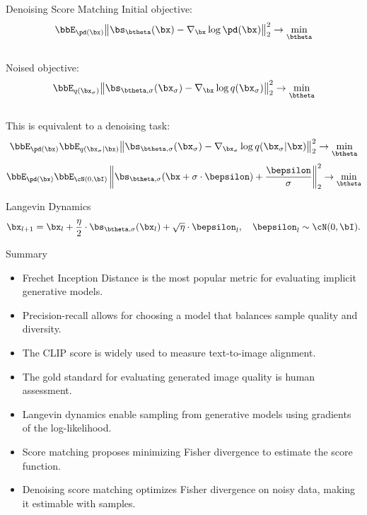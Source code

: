\documentclass{beamer}
\begin{document}
\begin{frame}{Denoising Score Matching}
	Initial objective:
	\vspace{-0.2cm}
	\[
		\bbE_{\pd(\bx)}\big\| \bs_{\btheta}(\bx) - \nabla_\bx \log \pd(\bx) \big\|^2_2 \rightarrow \min_{\btheta}
	\]
	\eqpause
	\vspace{-0.5cm} \\
	Noised objective:
	\vspace{-0.2cm}
	\[
		\bbE_{q(\bx_{\sigma})}\big\| \bs_{\btheta, \sigma}(\bx_\sigma) - \nabla_\bx \log q(\bx_{\sigma}) \big\|^2_2 \rightarrow \min_{\btheta}
	\]
	\eqpause
	\vspace{-0.5cm} \\
	This is equivalent to a denoising task:
	\vspace{-0.2cm}
	\[
		\bbE_{\pd(\bx)} \bbE_{q(\bx_{\sigma} | \bx)}\big\| \bs_{\btheta, \sigma}(\bx_{\sigma}) - \nabla_{\bx_{\sigma}} \log q(\bx_{\sigma} | \bx) \big\|^2_2 \rightarrow \min_{\btheta}
	\]
	\eqpause
	\vspace{-0.3cm}
	\[
		\bbE_{\pd(\bx)} \bbE_{\cN(0, \bI)}\left\| \bs_{\btheta, \sigma}(\bx + \sigma \cdot \bepsilon) + \frac{\bepsilon}{\sigma} \right\|^2_2 \rightarrow \min_{\btheta}
	\]
	\vspace{-0.5cm}
	\begin{block}{Langevin Dynamics}
		\vspace{-0.3cm}
		\[
			\bx_{l + 1} = \bx_l + \frac{\eta}{2} \cdot \bs_{\btheta, \sigma}(\bx_l) + \sqrt{\eta} \cdot \bepsilon_l, \quad \bepsilon_l \sim \cN(0, \bI).
		\]
		\vspace{-0.7cm}
	\end{block}
\end{frame}
\begin{frame}{Summary}
	\begin{itemize}
		\item Frechet Inception Distance is the most popular metric for evaluating implicit generative models.
		\vfill
		\item Precision-recall allows for choosing a model that balances sample quality and diversity.
		\vfill
		\item The CLIP score is widely used to measure text-to-image alignment.
		\vfill
		\item The gold standard for evaluating generated image quality is human assessment.
		\vfill
		\item Langevin dynamics enable sampling from generative models using gradients of the log-likelihood.
		\vfill
		\item Score matching proposes minimizing Fisher divergence to estimate the score function.
		\vfill
		\item Denoising score matching optimizes Fisher divergence on noisy data, making it estimable with samples.
	\end{itemize}
\end{frame}
\end{document}
